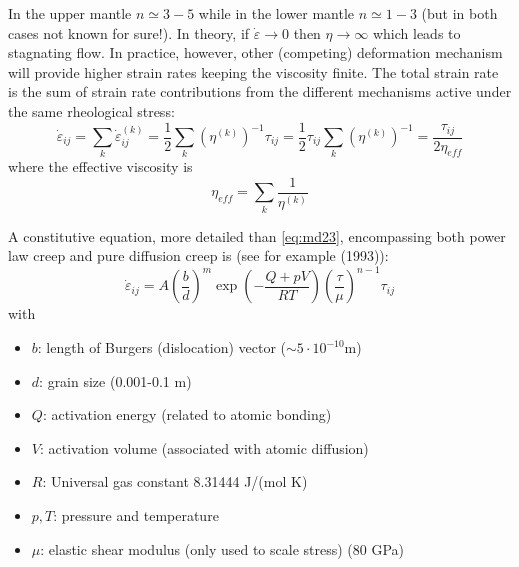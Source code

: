 \vspace{0.5cm}
\vspace{0.5cm}


In the upper mantle $n \simeq 3 - 5$ while in the lower mantle $n \simeq 1 - 3$ 
(but in both cases not known for sure!). 
In theory, if $\dot\varepsilon \rightarrow 0$ then $\eta \rightarrow\infty$ 
which leads to stagnating flow. In
practice, however, other (competing) deformation mechanism will provide higher strain
rates keeping the viscosity finite. The total strain rate is the sum of strain rate
contributions from the different mechanisms active under the same rheological stress:
\[
\dot\varepsilon_{ij} 
= \sum_k \dot\varepsilon_{ij}^{(k)} 
= \frac12 \sum_k (\eta^{(k)})^{-1} \tau_{ij}
= \frac12 \tau_{ij} \sum_k (\eta^{(k)})^{-1}
= \frac{\tau_{ij}}{2 \eta_{eff}} 
\]
where the effective viscosity is
\begin{equation}
\eta_{eff} = \sum_k \frac{1}{\eta^{(k)}}
\label{eq:md29}
\end{equation}

A constitutive equation, more detailed than \eqref{eq:md23}, encompassing both power law creep and
pure diffusion creep is (see for example \textcite{kawu93} (1993)):
\begin{equation}
\dot\varepsilon_{ij} = A \left( \frac{b}{d}\right)^m 
\exp \left( - \frac{Q + pV}{RT} \right) 
\left( \frac{\tau}{\mu}  \right)^{n-1}  \tau_{ij}
\label{eq:md30}
\end{equation}
with
\begin{itemize}
\item $b$: length of Burgers (dislocation) vector ($\sim 5 \cdot 10^{-10}\si{\meter}$)
\item $d$: grain size (0.001-0.1 m)
\item $Q$: activation energy (related to atomic bonding)
\item $V$: activation volume (associated with atomic diffusion)
\item $R$: Universal gas constant 8.31444 J/(mol K)
\item $p,T$: pressure and temperature
\item $\mu$: elastic shear modulus (only used to scale stress) (80 GPa)
\end{itemize}

